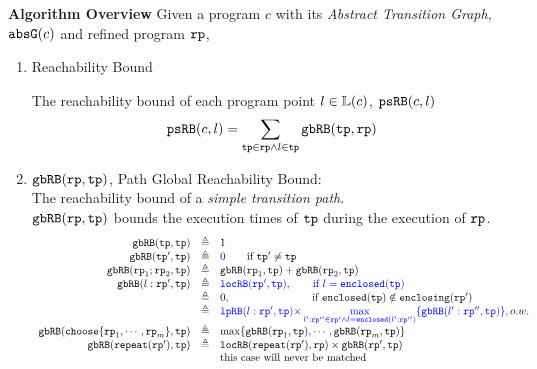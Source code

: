 \textbf{Algorithm Overview} 
Given a program $c$ with its \emph{Abstract Transition Graph}, $\mathtt{abs}{\mathtt{G}}(c)$ and refined program $\mathtt{rp}$,
\begin{enumerate}
    \item Reachability Bound
    
    The reachability bound of each program point $l \in \mathbb{L}(c)$, $\mathtt{psRB}(c, l)$
   \[ 
     \mathtt{psRB}(c, l) = \sum\limits_{\mathtt{tp} \in \mathtt{rp} \land 
   l \in \mathtt{tp}} \mathtt{gbRB}(\mathtt{tp}, \mathtt{rp})
   \]
    \item $\mathtt{gbRB}(\mathtt{rp}, \mathtt{tp}) $, Path Global Reachability Bound:  
    \\
    The reachability bound of a \emph{simple transition path}.
    \\
    $\mathtt{gbRB}(\mathtt{rp}, \mathtt{tp}) $ bounds the execution times of $\mathtt{tp}$ during the execution of $\mathtt{rp}$.
%
    \[
      \begin{array}{rcl}
        \inoutB(\tpath, \tpath) & \triangleq & 1  \\
        \inoutB(\tpath', \tpath) & \triangleq & \highlight{0} \qquad \text{if } \tpath' \neq \tpath\\
        \inoutB(\rprog_1;\rprog_2, \tpath) & \triangleq & \inoutB(\rprog_1, \tpath) + \inoutB(\rprog_2, \tpath) \\
        \inoutB(l: \rprog', \tpath) & \triangleq & 
        \highlight{\outinB(\rprog', \tpath), \qquad \text{if } l = \kw{enclosed}(\tpath)}
        \\
        &  \triangleq & 
       0, \qquad \qquad \qquad \quad ~~ \text{if }  \kw{enclosed}(\tpath) \notin \kw{enclosing}(\rprog')
        \\
        &  \triangleq & 
        \highlight{
          \lpchB(l:\rprog', \tpath ) }
        \highlight{\times \max\limits_{l':\rprog'' \in \rprog' \land l = \kw{enclosed}(l':\rprog'')}
       \{\inoutB(l':\rprog'', \tpath)\} }, o.w. \\
        \inoutB(\rpchoose{\rprog_1, \cdots, \rprog_m }, \tpath) & \triangleq 
        & \max\left\{ \inoutB(\rprog_1, \tpath), \cdots, \inoutB(\rprog_m, \tpath) \right\} \\
        \inoutB(\rprepeat(\rprog'), \tpath) & \triangleq & \outinB(\rprepeat(\rprog'), \rprog) \times \inoutB(\rprog', \tpath)\\
        &  & \text{this case will never be matched}
        \end{array}
      \]

\end{enumerate}
